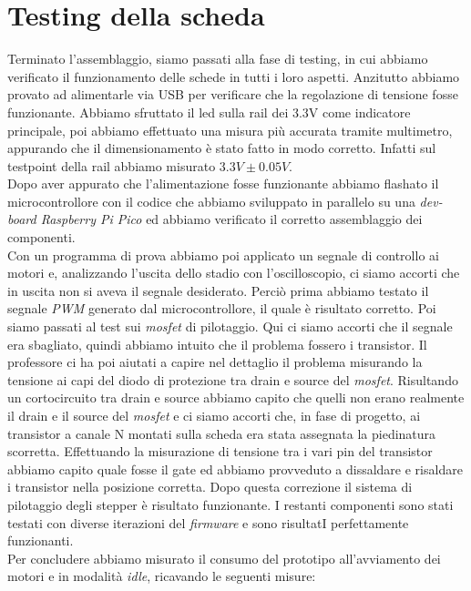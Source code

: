 \chapter{Testing della scheda}

Terminato l’assemblaggio, siamo passati alla fase di testing, in cui abbiamo verificato il funzionamento delle schede in tutti i loro aspetti.
Anzitutto abbiamo provato ad alimentarle via USB per verificare che la regolazione di tensione fosse funzionante. Abbiamo sfruttato il led sulla rail dei 3.3V come indicatore principale, poi abbiamo effettuato una misura più accurata tramite multimetro, appurando che il dimensionamento è stato fatto in modo corretto. Infatti sul testpoint della rail abbiamo misurato $3.3V \pm 0.05V$. \\
Dopo aver appurato che l’alimentazione fosse funzionante abbiamo flashato il microcontrollore con il codice che abbiamo sviluppato in parallelo su una \textit{dev-board Raspberry Pi Pico} ed abbiamo verificato il corretto assemblaggio dei componenti. \\
Con un programma di prova abbiamo poi applicato un segnale di controllo ai motori e, analizzando l’uscita dello stadio con l’oscilloscopio, ci siamo accorti che in uscita non si aveva il segnale desiderato. Perciò prima abbiamo testato il segnale \textit{PWM} generato dal microcontrollore, il quale è risultato corretto. Poi siamo passati al test sui \textit{mosfet} di pilotaggio. Qui ci siamo accorti che il segnale era sbagliato, quindi abbiamo intuito che il problema fossero i transistor. Il professore ci ha poi aiutati a capire nel dettaglio il problema misurando la tensione ai capi del diodo di protezione tra drain e source del \textit{mosfet}. Risultando un cortocircuito tra drain e source abbiamo capito che quelli non erano realmente il drain e il source del \textit{mosfet} e ci siamo accorti che, in fase di progetto, ai transistor a canale N montati sulla scheda era stata assegnata la piedinatura scorretta. Effettuando la misurazione di tensione tra i vari pin del transistor abbiamo capito quale fosse il gate ed abbiamo provveduto a dissaldare e risaldare i transistor nella posizione corretta. Dopo questa correzione il sistema di pilotaggio degli stepper è risultato funzionante.
I restanti componenti sono stati testati con diverse iterazioni del \textit{firmware} e sono risultatI perfettamente funzionanti. \\
Per concludere abbiamo misurato il consumo del prototipo all’avviamento dei motori e in modalità \textit{idle},  ricavando le seguenti misure:

